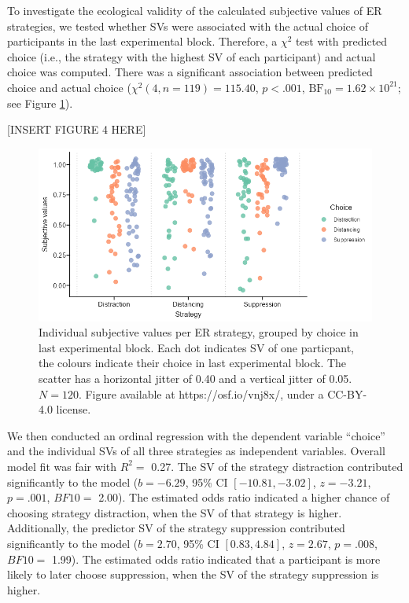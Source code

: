 \documentclass[
  man,floatsintext]{apa6}
\begin{document}
To investigate the ecological validity of the calculated subjective values of ER strategies, we tested whether SVs were associated with the actual choice of participants in the last experimental block.
Therefore, a \(\chi^{2}\) test with predicted choice (i.e., the strategy with the highest SV of each participant) and actual choice was computed.
There was a significant association between predicted choice and actual choice (\(\chi^2(4, n = 119) = 115.40\), \(p < .001\), \(\mathrm{BF}_{\textrm{10}} = 1.62 \times 10^{21}\); see Figure \ref{fig:FigSVChoice}).

{[}INSERT FIGURE 4 HERE{]}

\begin{figure}[H]
\includegraphics[width=\textwidth]{figures/FigSVChoice} \caption{Individual subjective values per ER strategy, grouped by choice in last experimental block. Each dot indicates SV of one particpant, the colours indicate their choice in last experimental block. The scatter has a horizontal jitter of 0.40 and a vertical jitter of 0.05. $N=120$. Figure available at https://osf.io/vnj8x/, under a CC-BY-4.0 license.}\label{fig:FigSVChoice}
\end{figure}

We then conducted an ordinal regression with the dependent variable ``choice'' and the individual SVs of all three strategies as independent variables.
Overall model fit was fair with \(R^{2}=\) 0.27.
The SV of the strategy distraction contributed significantly to the model (\(b = -6.29\), 95\% CI \([-10.81, -3.02]\), \(z = -3.21\), \(p = .001\), \(BF10=\) 2.00).
The estimated odds ratio indicated a higher chance of choosing strategy distraction, when the SV of that strategy is higher.
Additionally, the predictor SV of the strategy suppression contributed significantly to the model (\(b = 2.70\), 95\% CI \([0.83, 4.84]\), \(z = 2.67\), \(p = .008\), \(BF10=\) 1.99).
The estimated odds ratio indicated that a participant is more likely to later choose suppression, when the SV of the strategy suppression is higher.
\end{document}
